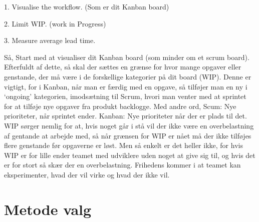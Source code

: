 1. Visualise the workflow. (Som er dit Kanban board)

2. Limit WIP. (work in Progress)

3. Measure average lead time.

Så, Start med at visualiser dit Kanban board (som minder om et scrum board). Efterfuldt af dette, så skal der sættes en grænse for hvor mange opgaver eller genstande, der må være i de forskellige kategorier på dit board (WIP). Denne er vigtigt, for i Kanban, når man er færdig med en opgave, så tilføjer man en ny i ‘ongoing’ kategorien, imodsætning til Scrum, hvori man venter med at sprintet for at tilføje nye opgaver fra produkt backlogge. Med andre ord, Scum: Nye prioriteter, når sprintet ender. Kanban: Nye prioriteter når der er plads til det.\cite{slides} WIP sørger nemlig for at, hvis noget går i stå vil der ikke være en overbelastning af gentande at arbejde med, så når grænsen for WIP er nået må der ikke tilføjes flere genstande før opgaverne er løst. Men så enkelt er det heller ikke, for hvis WIP er for lille ender teamet med udviklere uden noget at give sig til, og hvis det er for stort så skær der en overbelastning. Frihedens kommer i at teamet kan eksperimenter, hvad der vil virke og hvad der ikke vil. 


\section{Metode valg}


 


